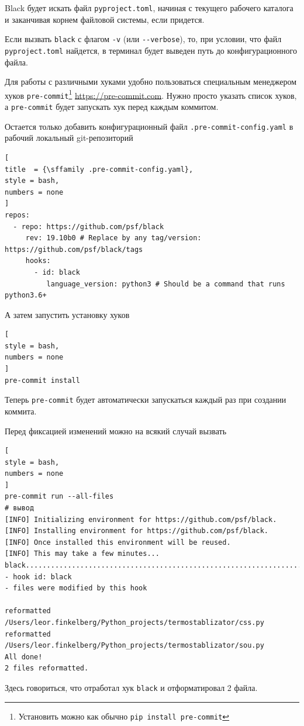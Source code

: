 \documentclass[%
	11pt,
	a4paper,
	utf8,
		]{article}
\begin{document}
Black будет искать файл \texttt{pyproject.toml}, начиная с текущего рабочего каталога и заканчивая корнем файловой системы, если придется.

Если вызвать \texttt{black} с флагом \verb|-v| (или \verb|--verbose|), то, при условии, что файл \texttt{pyproject.toml} найдется, в терминал будет выведен путь до конфигурационного файла.

Для работы с различными хуками удобно пользоваться специальным менеджером хуков \texttt{pre-commit}\footnote{Установить можно как обычно \texttt{pip install pre-commit}} \url{https://pre-commit.com}. Нужно просто указать список хуков, а \texttt{pre-commit} будет запускать хук перед каждым коммитом.

Остается только добавить конфигурационный файл \texttt{.pre-commit-config.yaml} в рабочий локальный git-репозиторий
\begin{lstlisting}[
title  = {\sffamily .pre-commit-config.yaml},
style = bash,
numbers = none	
]
repos:
  - repo: https://github.com/psf/black
     rev: 19.10b0 # Replace by any tag/version: https://github.com/psf/black/tags
     hooks:
       - id: black
          language_version: python3 # Should be a command that runs python3.6+
\end{lstlisting}

А затем запустить установку хуков
\begin{lstlisting}[
style = bash,
numbers = none	
]
pre-commit install
\end{lstlisting}

Теперь \texttt{pre-commit} будет автоматически запускаться каждый раз при создании коммита.

Перед фиксацией изменений можно на всякий случай вызвать
\begin{lstlisting}[
style = bash,
numbers = none	
]
pre-commit run --all-files
# вывод
[INFO] Initializing environment for https://github.com/psf/black.
[INFO] Installing environment for https://github.com/psf/black.
[INFO] Once installed this environment will be reused.
[INFO] This may take a few minutes...
black....................................................................Failed
- hook id: black
- files were modified by this hook

reformatted /Users/leor.finkelberg/Python_projects/termostablizator/css.py
reformatted /Users/leor.finkelberg/Python_projects/termostablizator/sou.py
All done!
2 files reformatted.
\end{lstlisting}

Здесь говориться, что отработал хук \texttt{black} и отформатировал 2 файла.
\end{document}
